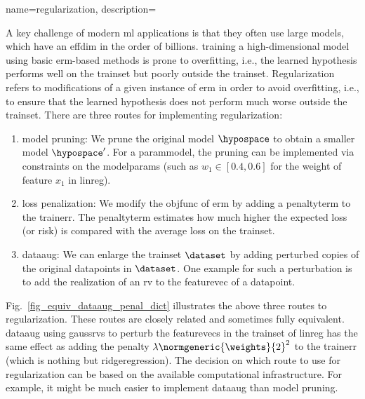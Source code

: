 {name={regularization}, 
	description={A key challenge of modern \gls{ml} applications is that they often 
		use large \glspl{model}, which have an \gls{effdim} in the order of billions. 
		\Gls{training} a high-dimensional \gls{model} using basic \gls{erm}-based methods
		is prone to \gls{overfitting}, i.e., the learned \gls{hypothesis} performs well on the \gls{trainset} 
		but poorly outside the \gls{trainset}. Regularization refers to modifications of a given instance 
		of \gls{erm} in order to avoid \gls{overfitting}, i.e., to ensure that the learned \gls{hypothesis} does 
		not perform much worse outside the \gls{trainset}. There are three routes for implementing 
		regularization: 
		\begin{enumerate}[label=\arabic*)]
			\item {\Gls{model} pruning:} We prune the original \gls{model} $\hypospace$ to obtain a 
			smaller \gls{model} $\hypospace'$. For a \gls{parammodel}, the pruning can be 
			implemented via constraints on the \glspl{modelparam} (such as $w_{1} \in [0.4,0.6]$ for 
			the \gls{weight} of \gls{feature} $x_{1}$ in \gls{linreg}).
			\item {\Gls{loss} penalization:} We modify the \gls{objfunc} of \gls{erm} by adding a 
			\gls{penaltyterm} to the \gls{trainerr}. The \gls{penaltyterm} estimates how much higher the 
			expected \gls{loss} (or \gls{risk}) is compared with the average \gls{loss} on the \gls{trainset}. 
			\item {\Gls{dataaug}:} We can enlarge the \gls{trainset} $\dataset$ by adding 
			perturbed copies of the original \glspl{datapoint} in $\dataset$. One example for such 
			a perturbation is to add the \gls{realization} of an \gls{rv} to the \gls{featurevec} 
			of a \gls{datapoint}. 
		\end{enumerate} 
		Fig.\ \ref{fig_equiv_dataaug_penal_dict} illustrates the above three routes to regularization. 
		These routes are closely related and sometimes fully equivalent. \Gls{dataaug} using \glspl{gaussrv} 
		to perturb the \glspl{featurevec} in the \gls{trainset} of \gls{linreg} 
		has the same effect as adding the penalty 
		$\lambda \normgeneric{\weights}{2}^2$ to the \gls{trainerr} (which is nothing but \gls{ridgeregression}). 
        		The decision on which route to use for regularization can be based on the 
        		available computational infrastructure. For example, it might be much easier to 
        		implement \gls{dataaug} than \gls{model} pruning. 
		\begin{figure}[H]

\end{figure}}}
